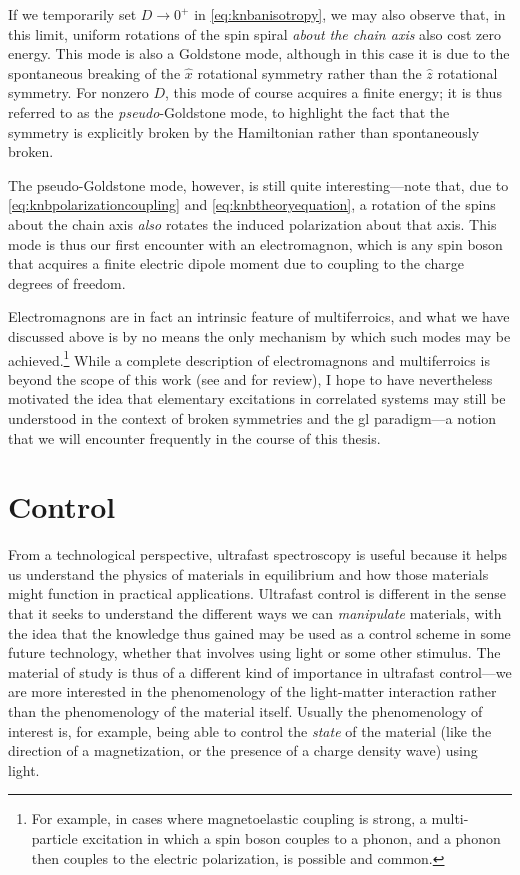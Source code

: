 If we temporarily set $D\rightarrow 0^+$ in \cref{eq:knbanisotropy}, we may also observe that, in this limit, uniform rotations of the spin spiral \emph{about the chain axis} also cost zero energy.
This mode is also a Goldstone mode, although in this case it is due to the spontaneous breaking of the $\hat{x}$ rotational symmetry rather than the $\hat{z}$ rotational symmetry.
For nonzero $D$, this mode of course acquires a finite energy; it is thus referred to as the \emph{pseudo}-Goldstone mode, to highlight the fact that the symmetry is explicitly broken by the Hamiltonian rather than spontaneously broken.

The pseudo-Goldstone mode, however, is still quite interesting---note that, due to \cref{eq:knbpolarizationcoupling} and \cref{eq:knbtheoryequation}, a rotation of the spins about the chain axis \emph{also} rotates the induced polarization about that axis.
This mode is thus our first encounter with an electromagnon, which is any spin boson that acquires a finite electric dipole moment due to coupling to the charge degrees of freedom.

Electromagnons are in fact an intrinsic feature of multiferroics, and what we have discussed above is by no means the only mechanism by which such modes may be achieved.\footnote{For example, in cases where magnetoelastic coupling is strong, a multi-particle excitation in which a spin boson couples to a phonon, and a phonon then couples to the electric polarization, is possible and common\citep{takahashi_magnetoelectric_2012}.}
While a complete description of electromagnons and multiferroics is beyond the scope of this work (see \citet{cheong_multiferroics_2007} and \citet{fiebig_evolution_2016} for review), I hope to have nevertheless motivated the idea that elementary excitations in correlated systems may still be understood in the context of broken symmetries and the \gls{gl} paradigm---a notion that we will encounter frequently in the course of this thesis.

\section{Control}

From a technological perspective, ultrafast spectroscopy is useful because it helps us understand the physics of materials in equilibrium and how those materials might function in practical applications.
Ultrafast control is different in the sense that it seeks to understand the different ways we can \emph{manipulate} materials, with the idea that the knowledge thus gained may be used as a control scheme in some future technology, whether that involves using light or some other stimulus.
The material of study is thus of a different kind of importance in ultrafast control---we are more interested in the phenomenology of the light-matter interaction rather than the phenomenology of the material itself.
Usually the phenomenology of interest is, for example, being able to control the \emph{state} of the material (like the direction of a magnetization, or the presence of a charge density wave) using light.


